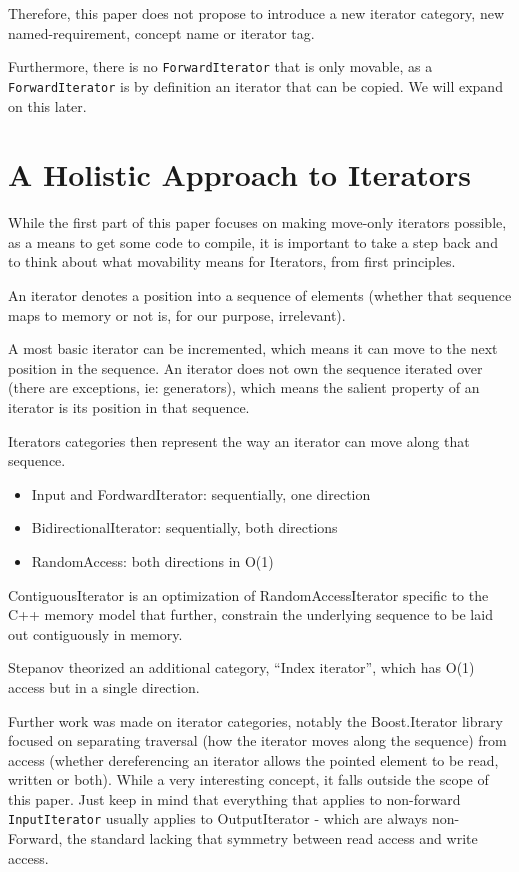 \documentclass{wg21}
\begin{document}
Therefore, this paper does not propose to introduce a new iterator
category, new named-requirement, concept name or iterator tag.

Furthermore, there is no \texttt{ForwardIterator} that is only movable,
as a \texttt{ForwardIterator} is by definition an iterator that can be
copied. We will expand on this later.

\hypertarget{a-holistic-approach-to-iterators}{%
	\section{A Holistic Approach to
		Iterators}\label{a-holistic-approach-to-iterators}}

While the first part of this paper focuses on making move-only iterators
possible, as a means to get some code to compile, it is important to
take a step back and to think about what movability means for Iterators,
from first principles.

An iterator denotes a position into a sequence of elements (whether that
sequence maps to memory or not is, for our purpose, irrelevant).

A most basic iterator can be incremented, which means it can move to the
next position in the sequence. An iterator does not own the sequence
iterated over (there are exceptions, ie: generators), which means the
salient property of an iterator is its position in that sequence.

Iterators categories then represent the way an iterator can move along
that sequence. 
\begin{itemize}
	\item Input and FordwardIterator: sequentially, one direction
	\item BidirectionalIterator: sequentially, both directions
	\item RandomAccess: both directions in O(1)
\end{itemize}

ContiguousIterator is an optimization of RandomAccessIterator specific
to the C++ memory model that further, constrain the underlying sequence
to be laid out contiguously in memory.

Stepanov theorized an additional category, ``Index iterator'', which has
O(1) access but in a single direction.

Further work was made on iterator categories, notably the Boost.Iterator
library focused on separating traversal (how the iterator moves along
the sequence) from access (whether dereferencing an iterator allows the
pointed element to be read, written or both). While a very interesting
concept, it falls outside the scope of this paper. Just keep in mind
that everything that applies to non-forward \texttt{InputIterator}
usually applies to OutputIterator - which are always non-Forward, the
standard lacking that symmetry between read access and write access.
\end{document}
